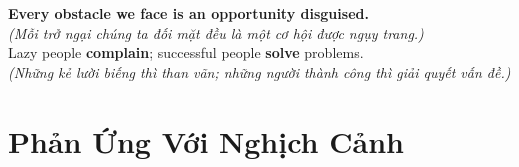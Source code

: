 \begin{baihoc}
  \textbf{Every obstacle we face is an opportunity disguised.}\\
  \textit{(Mỗi trở ngại chúng ta đối mặt đều là một cơ hội được ngụy trang.)}\\
  Lazy people \textbf{complain}; successful people \textbf{solve} problems.\\
  \textit{(Những kẻ lười biếng thì than vãn; những người thành công thì giải quyết vấn đề.)}
\end{baihoc}

\vspace{0.8cm}


\ngayDay{}

\section{Phản Ứng Với Nghịch Cảnh}
